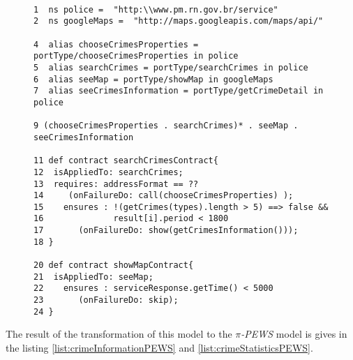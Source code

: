 \begin{figure}[ht!]
\tiny
\centering

\begin{lstlisting}[label=list:crimeInformationPEWS,caption=pi-PEWS
Specification: Crime information. ]

1  ns police =  "http:\\www.pm.rn.gov.br/service"
2  ns googleMaps =  "http://maps.googleapis.com/maps/api/"

4  alias chooseCrimesProperties = portType/chooseCrimesProperties in police
5  alias searchCrimes = portType/searchCrimes in police
6  alias seeMap = portType/showMap in googleMaps
7  alias seeCrimesInformation = portType/getCrimeDetail in police

9 (chooseCrimesProperties . searchCrimes)* . seeMap . seeCrimesInformation

11 def contract searchCrimesContract{
12  isAppliedTo: searchCrimes;    
13  requires: addressFormat == ?? 
14     (onFailureDo: call(chooseCrimesProperties) );  
15    ensures : !(getCrimes(types).length > 5) ==> false &&
16              result[i].period < 1800
17       (onFailureDo: show(getCrimesInformation())); 
18 }

20 def contract showMapContract{
21  isAppliedTo: seeMap;    
22    ensures : serviceResponse.getTime() < 5000
23       (onFailureDo: skip); 
24 }
\end{lstlisting}
\label{fig:crimeInformationPEWS}  
\end{figure}  


The result of the transformation of this model to the \textit{$\pi$-PEWS} model
is gives in the listing \ref{list:crimeInformationPEWS} and
\ref{list:crimeStatisticsPEWS}.


